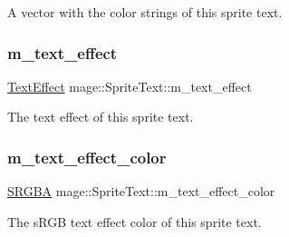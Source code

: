 A vector with the color strings of this sprite text. \hypertarget{classmage_1_1_sprite_text_a4019b7510bba20a9b86460fd6c47698f}{}\label{classmage_1_1_sprite_text_a4019b7510bba20a9b86460fd6c47698f} 
\subsubsection{\texorpdfstring{m\+\_\+text\+\_\+effect}{m\_text\_effect}}
{\footnotesize\ttfamily \hyperlink{classmage_1_1_sprite_text_a4d3101d037b6fe4247d77b5fbf811dd2}{Text\+Effect} mage\+::\+Sprite\+Text\+::m\+\_\+text\+\_\+effect\hspace{0.3cm}{\ttfamily [private]}}

The text effect of this sprite text. \hypertarget{classmage_1_1_sprite_text_a82f53e64dc8cc9a9d23a1c26ee9fad9e}{}\label{classmage_1_1_sprite_text_a82f53e64dc8cc9a9d23a1c26ee9fad9e} 
\subsubsection{\texorpdfstring{m\+\_\+text\+\_\+effect\+\_\+color}{m\_text\_effect\_color}}
{\footnotesize\ttfamily \hyperlink{structmage_1_1_s_r_g_b_a}{S\+R\+G\+BA} mage\+::\+Sprite\+Text\+::m\+\_\+text\+\_\+effect\+\_\+color\hspace{0.3cm}{\ttfamily [private]}}

The s\+R\+GB text effect color of this sprite text. 